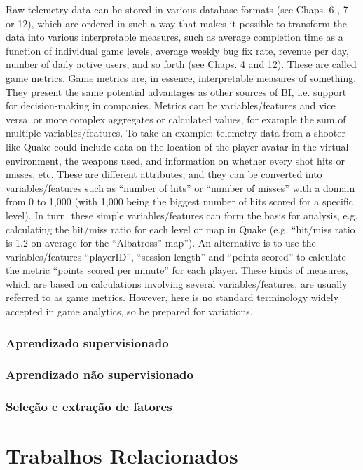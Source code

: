 Raw telemetry data can be stored in various database formats (see Chaps. 6 , 7 or 12), which are ordered in such a way that makes it possible to transform the data into various interpretable measures, such as average completion time as a function of individual game levels, average weekly bug fix rate, revenue per day, number of daily active users, and so forth (see Chaps. 4 and 12). These are called game metrics. Game metrics are, in essence, interpretable measures of something. They present the same potential advantages as other sources of BI, i.e. support for decision-making in companies. Metrics can be variables/features and vice versa, or more complex aggregates or calculated values, for example the sum of multiple variables/features. To take an example: telemetry data from a shooter like Quake could include data on the location of the player avatar in the virtual environment, the weapons used, and information on whether every shot hits or misses, etc. These are different attributes, and they can be converted into variables/features such as “number of hits” or “number of misses” with a domain from 0 to 1,000 (with 1,000 being the biggest number of hits scored for a specific level). In turn, these simple variables/features can form the basis for analysis, e.g. calculating the hit/miss ratio for each level or map in Quake (e.g. “hit/miss ratio is 1.2 on average for the “Albatross” map”). An alternative is to use the variables/features “playerID”, “session length” and “points scored” to calculate the metric “points scored per minute” for each player. These kinds of measures, which are based on calculations involving several variables/features, are usually referred to as game metrics. However, here is no standard terminology widely accepted in game analytics, so be prepared for variations.

\subsection{Aprendizado supervisionado}
\subsection{Aprendizado não supervisionado}
\subsection{Seleção e extração de fatores}

\chapter{Trabalhos Relacionados}

